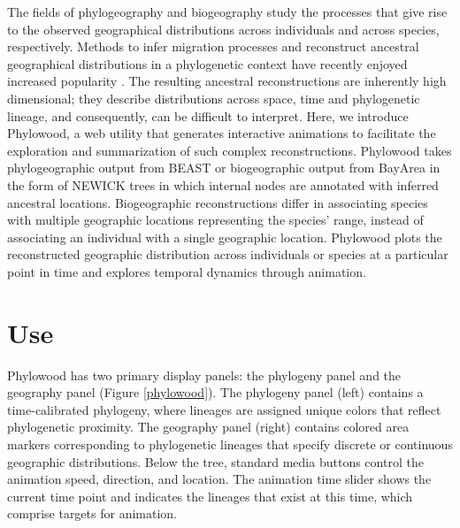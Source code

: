 \documentclass{bioinfo}
\begin{document}
The fields of phylogeography and biogeography study the processes that give rise to the observed geographical distributions across individuals and across species, respectively. Methods to infer migration processes and reconstruct ancestral geographical distributions in a phylogenetic context have recently enjoyed increased popularity \citep{ree08, lemey09, yu10, landis12}. The resulting ancestral reconstructions are inherently high dimensional; they describe distributions across space, time and phylogenetic lineage, and consequently, can be difficult to interpret. Here, we introduce Phylowood, a web utility that generates interactive animations to facilitate the exploration and summarization of such complex reconstructions.
Phylowood takes phylogeographic output from BEAST \citep{drummond12} or biogeographic output from BayArea \citep{landis12} in the form of NEWICK trees in which internal nodes are annotated with inferred ancestral locations. Biogeographic reconstructions differ in associating species with multiple geographic locations representing the species' range, instead of associating an individual with a single geographic location. Phylowood plots the reconstructed geographic distribution across individuals or species at a particular point in time and explores temporal dynamics through animation.

\section{Use}

Phylowood has two primary display panels: the phylogeny panel and the geography panel (Figure \ref{phylowood}). The phylogeny panel (left) contains a time-calibrated phylogeny, where lineages are assigned unique colors that reflect phylogenetic proximity. The geography panel (right) contains colored area markers corresponding to phylogenetic lineages that specify discrete or continuous geographic distributions. Below the tree, standard media buttons control the animation speed, direction, and location. The animation time slider shows the current time point and indicates the lineages that exist at this time, which comprise targets for animation.

\end{document}
